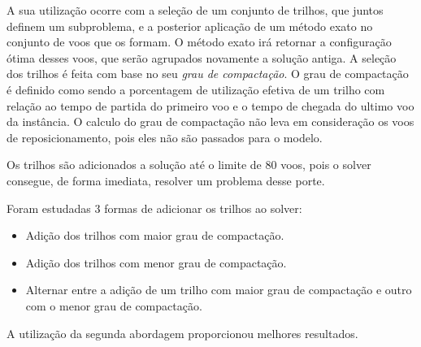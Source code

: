A sua utilização ocorre com a seleção de um conjunto de trilhos, que juntos
definem um subproblema, e a posterior aplicação de um método exato no conjunto
de voos que os formam. O método exato irá retornar a configuração ótima desses
voos, que serão agrupados novamente a solução antiga. A seleção dos trilhos é
feita com base no seu \textit{grau de compactação}. O grau de compactação é
definido como sendo a porcentagem de utilização efetiva de um trilho com
relação ao tempo de partida do primeiro voo e o tempo de chegada do ultimo voo
da instância. O calculo do grau de compactação não leva em consideração os voos
de reposicionamento, pois eles não são passados para o modelo.
 
Os trilhos são adicionados a solução até o limite de 80 voos, pois o solver
consegue, de forma imediata, resolver um problema desse porte.
	
Foram estudadas 3 formas de adicionar os trilhos ao solver:
	
	\begin{itemize}
\item Adição dos trilhos com maior grau de compactação.
\item Adição dos trilhos com menor grau de compactação.
\item Alternar entre a adição de um trilho com maior grau de compactação e outro com o menor grau de compactação.
\end{itemize}
 
 A utilização da segunda abordagem proporcionou melhores resultados.
 
 